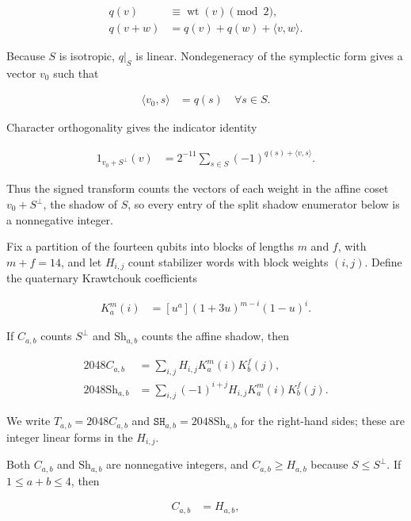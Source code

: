 \documentclass[11pt]{article}
\newcommand{\Sh}{\mathrm{Sh}}
\begin{document}
\[
\begin{aligned}
q(v) &\equiv\operatorname{wt}(v) \pmod 2, \\
q(v+w) &=q(v) + q(w) + \langle v,w \rangle.
\end{aligned}
\]

Because \(S\) is isotropic, \(q|_{S}\) is linear. Nondegeneracy of the symplectic form gives a vector \(v_{0}\) such that

\[
\begin{aligned}
\langle v_{0},s \rangle &=q(s)\quad\forall s \in S.
\end{aligned}
\]

Character orthogonality gives the indicator identity

\[
\begin{aligned}
1_{v_{0}+S^\perp}(v)
& = 2^{-11} \sum_{s \in S} (-1)^{q(s)+\langle v,s \rangle}.
\end{aligned}
\]

Thus the signed transform counts the vectors of each weight in the affine coset \(v_{0}+S^\perp\), the shadow of \(S\), so every entry of the split shadow enumerator below is a nonnegative integer.

Fix a partition of the fourteen qubits into blocks of lengths \(m\) and \(f\), with \(m+f=14\), and let \(H_{i,j}\) count stabilizer words with block weights \((i,j)\). Define the quaternary Krawtchouk coefficients

\[
\begin{aligned}
K_{a}^{m}(i) &=[u^{a}] (1+3u)^{m-i} (1-u)^{i}.
\end{aligned}
\]

If \(C_{a,b}\) counts \(S^\perp\) and \(\Sh_{a,b}\) counts the affine shadow, then

\[
\begin{aligned}
2048 C_{a,b}
& = \sum_{i,j} H_{i,j} K_{a}^{m}(i) K_{b}^{f}(j), \\[0.4ex]
2048 \Sh_{a,b}
& = \sum_{i,j} (-1)^{i+j} H_{i,j} K_{a}^{m}(i) K_{b}^{f}(j).
\end{aligned}
\]

We write \(T_{a,b}=2048C_{a,b}\) and \(\mathtt{SH}_{a,b}=2048\Sh_{a,b}\) for the right-hand sides; these are integer linear forms in the \(H_{i,j}\).

Both \(C_{a,b}\) and \(\Sh_{a,b}\) are nonnegative integers, and \(C_{a,b} \geq H_{a,b}\) because \(S \leq S^\perp\). If \(1 \leq a+b \leq 4\), then

\[
\begin{aligned}
C_{a,b} &=H_{a,b},
\end{aligned}
\]
\end{document}
